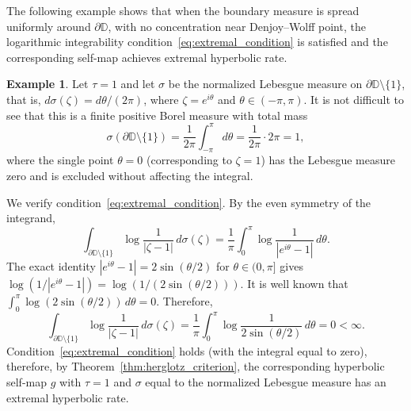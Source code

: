 \documentclass[12pt]{amsart}
\numberwithin{equation}{section}
\theoremstyle{plain}
\theoremstyle{definition}
\newtheorem{example}[equation]{Example}
\begin{document}
The following example shows that when the boundary measure
is spread uniformly around $\partial\mathbb{D}$, with no
concentration near Denjoy--Wolff point, the logarithmic
integrability condition~\eqref{eq:extremal_condition} is
satisfied and the corresponding self-map achieves extremal
hyperbolic rate.
\begin{example}
\label{ex:uniform}
Let $\tau=1$ and let $\sigma$ be the normalized Lebesgue measure
on $\partial\mathbb{D}\setminus\{1\}$, that is,
$d\sigma(\zeta)=d\theta/(2\pi)$, where $\zeta=e^{i\theta}$ and
$\theta\in(-\pi,\pi)$.
It is not difficult to see that this is a finite positive Borel measure with total mass
\begin{equation*}
\sigma(\partial\mathbb{D}\setminus\{1\})
=\frac{1}{2\pi}\int_{-\pi}^{\pi}d\theta
=\frac{1}{2\pi}\cdot 2\pi=1,
\end{equation*}
where the single point $\theta=0$ (corresponding to
$\zeta=1$) has the Lebesgue measure zero and is excluded
without affecting the integral.

We verify condition~\eqref{eq:extremal_condition}.
By the even symmetry of the integrand,
\begin{equation*}
\int_{\partial\mathbb{D}\setminus\{1\}}
\log\frac{1}{|\zeta-1|}\,d\sigma(\zeta)
=\frac{1}{\pi}\int_0^{\pi}
\log\frac{1}{|e^{i\theta}-1|}\,d\theta.
\end{equation*}
The exact identity $|e^{i\theta}-1|=2\sin(\theta/2)$
for $\theta\in(0,\pi]$ gives
$\log(1/|e^{i\theta}-1|)=\log(1/(2\sin(\theta/2)))$.
It is well known that
$\int_0^\pi\log(2\sin(\theta/2))\,d\theta=0$. Therefore,
\begin{equation*}
\int_{\partial\mathbb{D}\setminus\{1\}}
\log\frac{1}{|\zeta-1|}\,d\sigma(\zeta)
=\frac{1}{\pi}\int_0^\pi\log\frac{1}{2\sin(\theta/2)}\,d\theta
=0<\infty.
\end{equation*}
Condition~\eqref{eq:extremal_condition} holds (with the integral equal to zero), therefore, by
Theorem~\ref{thm:herglotz_criterion}, the corresponding hyperbolic self-map $g$
with $\tau=1$ and $\sigma$ equal to the normalized Lebesgue measure has an extremal hyperbolic rate.
\end{example}
\end{document}
